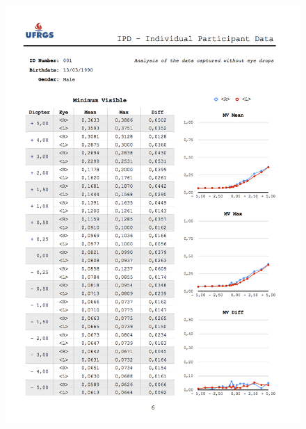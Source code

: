 \begin{figure}[h]
	
	\centering
	\includegraphics[width=1.0\linewidth]{__Images/08/IPD_001_6.png}
\end{figure}